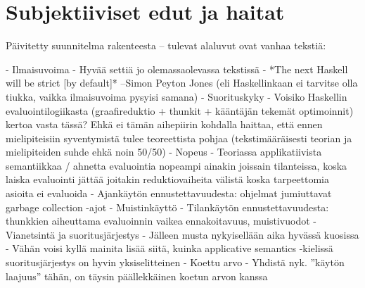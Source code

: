 

\section{Subjektiiviset edut ja haitat} \label{subjektiiviset-edut}

\begin{markdown}
Päivitetty suunnitelma rakenteesta – tulevat alaluvut ovat vanhaa tekstiä:

- Ilmaisuvoima
	- Hyvää settiä jo olemassaolevassa tekstissä
	- *The next Haskell will be strict [by default]* –Simon Peyton Jones (eli Haskellinkaan ei tarvitse olla tiukka, vaikka ilmaisuvoima pysyisi samana)
- Suorituskyky
	- Voisiko Haskellin evaluointilogiikasta  (graafireduktio + thunkit + kääntäjän tekemät optimoinnit) kertoa vasta tässä? Ehkä ei tämän aihepiirin kohdalla haittaa, että ennen mielipiteisiin syventymistä tulee teoreettista pohjaa (tekstimääräisesti teorian ja mielipiteiden suhde ehkä noin 50/50)
	- Nopeus
		- Teoriassa applikatiivista semantiikkaa / ahnetta evaluointia nopeampi ainakin joissain tilanteissa, koska laiska evaluointi jättää joitakin reduktiovaiheita välistä koska tarpeettomia asioita ei evaluoida
		- Ajankäytön ennustettavuudesta: ohjelmat jumiuttavat garbage collection -ajot
	- Muistinkäyttö
		- Tilankäytön ennustettavuudesta: thunkkien aiheuttama evaluoinnin vaikea ennakoitavuus, muistivuodot
- Vianetsintä ja suoritusjärjestys
	- Jälleen musta nykyisellään aika hyvässä kuosissa
	- Vähän voisi kyllä mainita lisää siitä, kuinka applicative semantics -kielissä suoritusjärjestys on hyvin yksiselitteinen
- Koettu arvo
	- Yhdistä nyk. ”käytön laajuus” tähän, on täysin päällekkäinen koetun arvon kanssa
\end{markdown}

